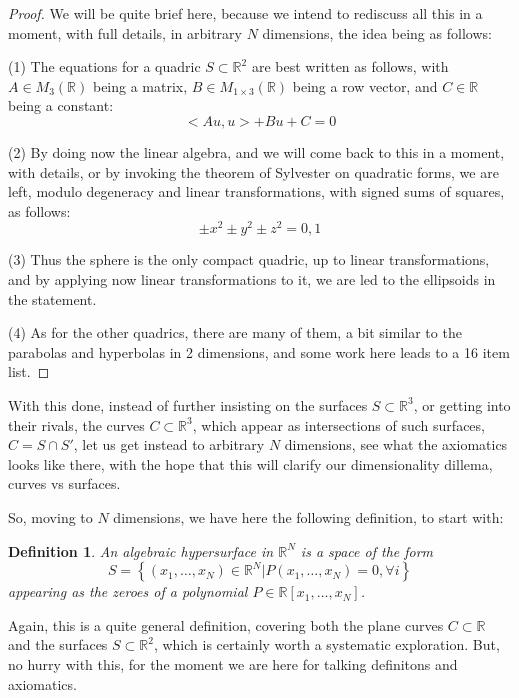 \documentclass[12pt]{amsbook}
\newtheorem{definition}[theorem]{Definition}
\begin{document}
\begin{proof}
We will be quite brief here, because we intend to rediscuss all this in a moment, with full details, in arbitrary $N$ dimensions, the idea being as follows:

\medskip

(1) The equations for a quadric $S\subset\mathbb R^2$ are best written as follows, with $A\in M_3(\mathbb R)$ being a matrix, $B\in M_{1\times 3}(\mathbb R)$ being a row vector, and $C\in\mathbb R$ being a constant:
$$<Au,u>+Bu+C=0$$

(2) By doing now the linear algebra, and we will come back to this in a moment, with details, or by invoking the theorem of Sylvester on quadratic forms, we are left, modulo degeneracy and linear transformations, with signed sums of squares, as follows:
$$\pm x^2\pm y^2\pm z^2=0,1$$

(3) Thus the sphere is the only compact quadric, up to linear transformations, and by applying now linear transformations to it, we are led to the ellipsoids in the statement.

\medskip

(4) As for the other quadrics, there are many of them, a bit similar to the parabolas and hyperbolas in 2 dimensions, and some work here leads to a 16 item list.
\end{proof}

With this done, instead of further insisting on the surfaces $S\subset\mathbb R^3$, or getting into their rivals, the curves $C\subset\mathbb R^3$, which appear as intersections of such surfaces, $C=S\cap S'$, let us get instead to arbitrary $N$ dimensions, see what the axiomatics looks like there, with the hope that this will clarify our dimensionality dillema, curves vs surfaces.

\bigskip

So, moving to $N$ dimensions, we have here the following definition, to start with:


\begin{definition}
An algebraic hypersurface in $\mathbb R^N$ is a space of the form
$$S=\left\{(x_1,\ldots,x_N)\in\mathbb R^N\Big|P(x_1,\ldots,x_N)=0,\forall i\right\}$$
appearing as the zeroes of a polynomial $P\in\mathbb R[x_1,\ldots,x_N]$.
\end{definition}

Again, this is a quite general definition, covering both the plane curves $C\subset\mathbb R$ and the surfaces $S\subset\mathbb R^2$, which is certainly worth a systematic exploration. But, no hurry with this, for the moment we are here for talking definitons and axiomatics.
\end{document}
